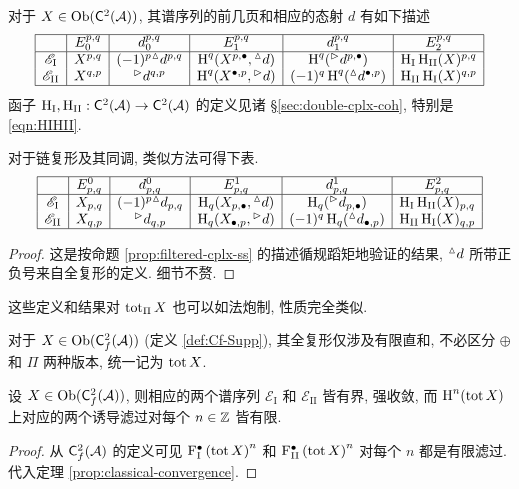 \begin{proposition}\label{prop:double-cplx-ss}
	对于 $X \in \operatorname{Ob}(\mathsf{C}^2(\mathcal{A}))$, 其谱序列的前几页和相应的态射 $d$ 有如下描述
	\[\begin{array}{|c|c|c|c|c|c|} \hline
		& E_0^{p,q} & d_0^{p,q} & E_1^{p,q} & d_1^{p,q} & E_2^{p,q} \\ \hline
		\mathscr{E}_{\mathrm{I}} & X^{p,q} & (-1)^p {}^\vartriangle d^{p,q} & \operatorname{H}^q(X^{p, \bullet}, {}^\vartriangle d) & \operatorname{H}^q({}^\vartriangleright d^{p, \bullet}) & \operatorname{H}_{\mathrm{I}}\operatorname{H}_{\mathrm{II}}(X)^{p,q} \\
		\mathscr{E}_{\mathrm{II}} & X^{q,p} & {}^\vartriangleright d^{q,p} & \operatorname{H}^q(X^{\bullet, p}, {}^\vartriangleright d) & (-1)^q \operatorname{H}^q({}^\vartriangle d^{\bullet, p}) & \operatorname{H}_{\mathrm{II}} \operatorname{H}_{\mathrm{I}}(X)^{q,p} \\ \hline
	\end{array}\]
	函子 $\operatorname{H}_{\mathrm{I}}, \operatorname{H}_{\mathrm{II}}: \mathsf{C}^2(\mathcal{A}) \to \mathsf{C}^2(\mathcal{A})$ 的定义见诸 \S\ref{sec:double-cplx-coh}, 特别是 \eqref{eqn:HIHII}.
	
	对于链复形及其同调, 类似方法可得下表.
	\[\begin{array}{|c|c|c|c|c|c|} \hline
		& E^0_{p,q} & d^0_{p,q} & E^1_{p,q} & d^1_{p,q} & E^2_{p,q} \\ \hline
		\mathscr{E}_{\mathrm{I}} & X_{p,q} & (-1)^p {}^\vartriangle d_{p,q} & \operatorname{H}_q(X_{p, \bullet}, {}^\vartriangle d) & \operatorname{H}_q({}^\vartriangleright d_{p, \bullet}) & \operatorname{H}_{\mathrm{I}}\operatorname{H}_{\mathrm{II}}(X)_{p,q} \\
		\mathscr{E}_{\mathrm{II}} & X_{q,p} & {}^\vartriangleright d_{q,p} & \operatorname{H}_q(X_{\bullet, p}, {}^\vartriangleright d) & (-1)^q \operatorname{H}_q({}^\vartriangle d_{\bullet, p}) & \operatorname{H}_{\mathrm{II}} \operatorname{H}_{\mathrm{I}}(X)_{q,p} \\ \hline
	\end{array}\]
\end{proposition}
\begin{proof}
	这是按命题 \ref{prop:filtered-cplx-ss} 的描述循规蹈矩地验证的结果, ${}^\vartriangle d$ 所带正负号来自全复形的定义. 细节不赘.
\end{proof}

这些定义和结果对 $\operatorname{tot}_{\Pi} X$ 也可以如法炮制, 性质完全类似.

对于 $X \in \operatorname{Ob}(\mathsf{C}^2_f(\mathcal{A}))$ (定义 \ref{def:Cf-Supp}), 其全复形仅涉及有限直和, 不必区分 $\oplus$ 和 $\Pi$ 两种版本, 统一记为 $\operatorname{tot} X$.

\begin{theorem}\label{prop:tot-ss}
	设 $X \in \operatorname{Ob}(\mathsf{C}^2_f(\mathcal{A}))$, 则相应的两个谱序列 $\mathscr{E}_{\mathrm{I}}$ 和 $\mathscr{E}_{\mathrm{II}}$ 皆有界, 强收敛, 而 $\operatorname{H}^n(\operatorname{tot} X)$ 上对应的两个诱导滤过对每个 $n \in \mathbb{Z}$ 皆有限.
\end{theorem}
\begin{proof}
	从 $\mathsf{C}^2_f(\mathcal{A})$ 的定义可见 $\mathrm{F}_{\mathrm{I}}^\bullet \left( \operatorname{tot} X \right)^n$ 和 $\mathrm{F}_{\mathrm{II}}^\bullet \left( \operatorname{tot} X \right)^n$ 对每个 $n$ 都是有限滤过. 代入定理 \ref{prop:classical-convergence}.
\end{proof}

